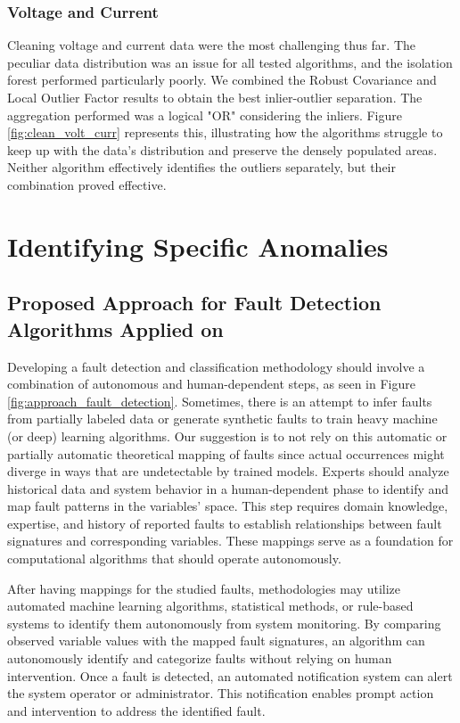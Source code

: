 \subsubsection{Voltage and Current}

Cleaning voltage and current data were the most challenging thus far. The peculiar data distribution was an issue for all tested algorithms, and the isolation forest performed particularly poorly. We combined the Robust Covariance and Local Outlier Factor results to obtain the best inlier-outlier separation. The aggregation performed was a logical "OR" considering the inliers. Figure \ref{fig:clean_volt_curr} represents this, illustrating how the algorithms struggle to keep up with the data's distribution and preserve the densely populated areas. Neither algorithm effectively identifies the outliers separately, but their combination proved effective.

\section{Identifying Specific Anomalies} \label{sec:pvplugin}

\subsection{Proposed Approach for Fault Detection Algorithms Applied on }

Developing a fault detection and classification methodology should involve a combination of autonomous and human-dependent steps, as seen in Figure \ref{fig:approach_fault_detection}. Sometimes, there is an attempt to infer faults from partially labeled data or generate synthetic faults to train heavy machine (or deep) learning algorithms. Our suggestion is to not rely on this automatic or partially automatic theoretical mapping of faults since actual occurrences might diverge in ways that are undetectable by trained models.
Experts should analyze historical data and system behavior in a human-dependent phase to identify and map fault patterns in the variables' space. This step requires domain knowledge, expertise, and history of reported faults to establish relationships between fault signatures and corresponding variables. These mappings serve as a foundation for computational algorithms that should operate autonomously.

After having mappings for the studied faults, methodologies may utilize automated machine learning algorithms, statistical methods, or rule-based systems to identify them autonomously from system monitoring. By comparing observed variable values with the mapped fault signatures, an algorithm can autonomously identify and categorize faults without relying on human intervention.
Once a fault is detected, an automated notification system can alert the system operator or administrator. This notification enables prompt action and intervention to address the identified fault.

